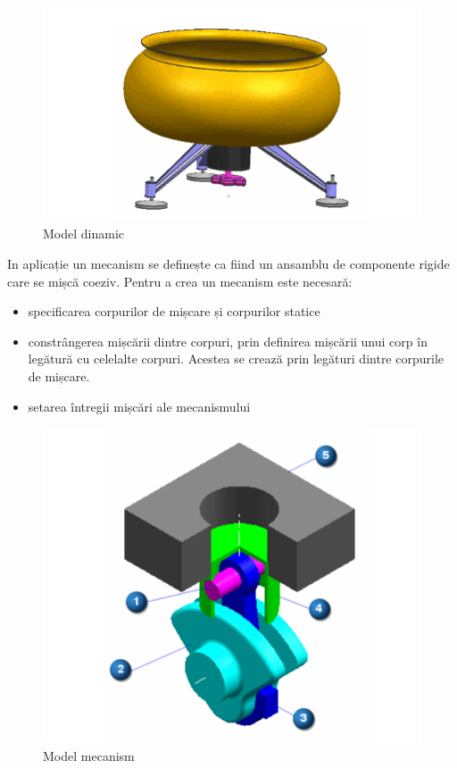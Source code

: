 \begin{figure}[H]
    \begin{center}
        \includegraphics[scale=0.7]{imagini/simcenter/dinamic.png}
        \caption{Model dinamic}
        \label{fig:tabs}
    \end{center}    
\end{figure}

In aplicație un mecanism se definește ca fiind un ansamblu de componente rigide care se mișcă coeziv. 
Pentru a crea un mecanism este necesară:
\begin{itemize}
    \item specificarea corpurilor de mișcare și corpurilor statice
    \item constrângerea mișcării dintre corpuri, prin definirea mișcării unui corp în legătură cu celelalte corpuri. 
    Acestea se crează prin legături dintre corpurile de mișcare.
    \item setarea întregii mișcări ale mecanismului
\end{itemize}

\begin{figure}[H]
    \begin{center}
        \includegraphics[scale=0.7]{imagini/simcenter/mecanism.png}
        \caption{Model mecanism}
        \label{fig:tabs}
    \end{center}    
\end{figure}

